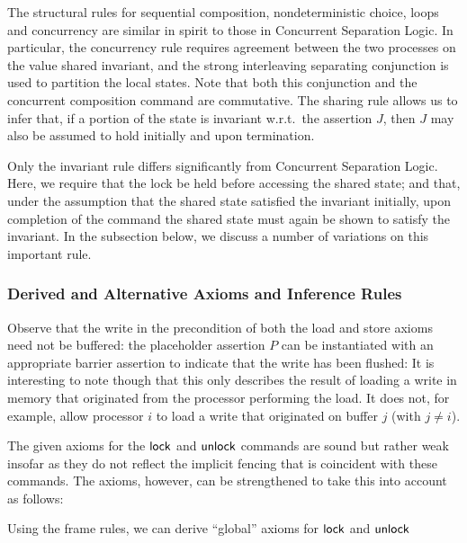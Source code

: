 \documentclass[11pt]{report}
\begin{document}
The structural rules for sequential composition, nondeterministic choice, loops and concurrency are similar in spirit to those in Concurrent Separation Logic. In particular, the concurrency rule requires agreement between the two processes on the value shared invariant, and the strong interleaving separating conjunction is used to partition the local states. Note that both this conjunction and the concurrent composition command are commutative. The sharing rule allows us to infer that, if a portion of the state is invariant w.r.t.\ the assertion $J$, then $J$ may also be assumed to hold initially and upon termination. 

Only the invariant rule differs significantly from Concurrent Separation Logic. Here, we require that the lock be held before accessing the shared state; and that, under the assumption that the shared state satisfied the invariant initially, upon completion of the command the shared state must again be shown to satisfy the invariant. In the subsection below, we discuss a number of variations on this important rule. 

\subsubsection{Derived and Alternative Axioms and Inference Rules}

Observe that the write in the precondition of both the load and store axioms need not be buffered: the placeholder assertion $P$ can be instantiated with an appropriate barrier assertion to indicate that the write has been flushed: 
 It is interesting to note though that this only describes the result of loading a write in memory that originated from the processor performing the load. It does not, for example, allow processor $i$ to load a write that originated on buffer $j$ (with $j \neq i$).

The given axioms for the $\operatorname{\mathsf{lock}}$ and $\operatorname{\mathsf{unlock}}$ commands are sound but rather weak insofar as they do not reflect the implicit fencing that is coincident with these commands. The axioms, however, can be strengthened to take this into account as follows: 

Using the frame rules, we can derive ``global'' axioms for $\operatorname{\mathsf{lock}}$ and $\operatorname{\mathsf{unlock}}$
\end{document}
